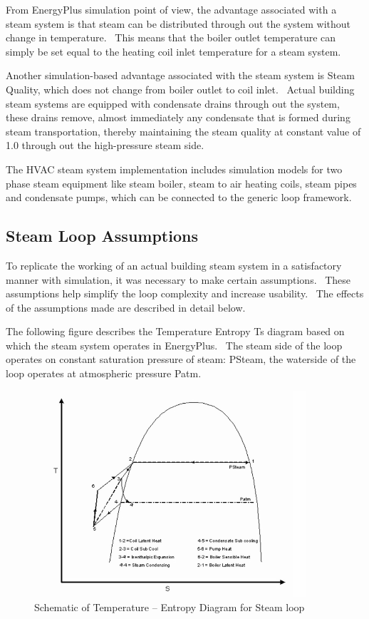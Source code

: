 From EnergyPlus simulation point of view, the advantage associated with a steam system is that steam can be distributed through out the system without change in temperature.~ This means that the boiler outlet temperature can simply be set equal to the heating coil inlet temperature for a steam system.

Another simulation-based advantage associated with the steam system is Steam Quality, which does not change from boiler outlet to coil inlet.~ Actual building steam systems are equipped with condensate drains through out the system, these drains remove, almost immediately any condensate that is formed during steam transportation, thereby maintaining the steam quality at constant value of 1.0 through out the high-pressure steam side.

The HVAC steam system implementation includes simulation models for two phase steam equipment like steam boiler, steam to air heating coils, steam pipes and condensate pumps, which can be connected to the generic loop framework.

\subsection{Steam Loop Assumptions}\label{steam-loop-assumptions}

To replicate the working of an actual building steam system in a satisfactory manner with simulation, it was necessary to make certain assumptions.~ These assumptions help simplify the loop complexity and increase usability.~ The effects of the assumptions made are described in detail below.

The following figure describes the Temperature Entropy Ts diagram based on which the steam system operates in EnergyPlus.~ The steam side of the loop operates on constant saturation pressure of steam: PSteam, the waterside of the loop operates at atmospheric pressure Patm.

\begin{figure}[hbtp] %
\centering
\includegraphics[width=0.9\textwidth, height=0.9\textheight, keepaspectratio=true]{media/image1986.png}
\caption{Schematic of Temperature – Entropy Diagram for Steam loop \protect \label{fig:schematic-of-temperature-entropy-diagram-for}}
\end{figure}

